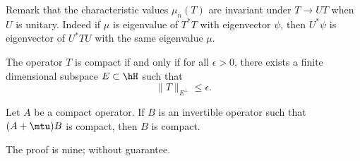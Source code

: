 Remark\label{pg_char_inv_U} that the characteristic values $\mu_n(T)$ are invariant under $T\to UT$ when $U$ is unitary. Indeed if $\mu$ is eigenvalue of $T^*T$ with eigenvector $\psi$, then $U^*\psi$ is eigenvector of $U^*TU$ with the same eigenvalue $\mu$.

\begin{proposition}
The operator $T$ is compact if and only if for all $\epsilon>0$, there exists a finite dimensional subspace $E\subset \hH$ such that
\[ 
  \| T \|_{E^{\perp}}\leq\epsilon.
\]
 \label{prop_comp_ini}
\end{proposition}

\begin{lemma}		\label{LemAmtuBcompaBcm}
	Let $A$ be a compact operator. If $B$ is an invertible operator such that $(A+\mtu)B$ is compact, then $B$ is compact.
\end{lemma}

\begin{probleme}
	The proof is mine; without guarantee.
\end{probleme}

